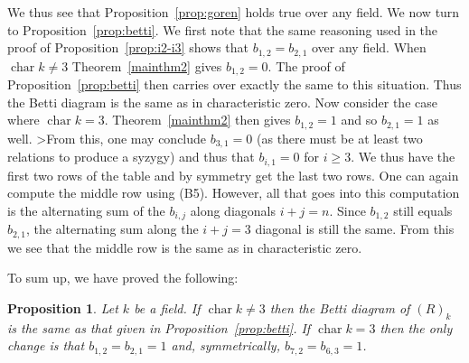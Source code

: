 \documentclass{amsart}
\newtheorem{proposition}[theorem]{Proposition}
\theoremstyle{definition}
\theoremstyle{remark}
\DeclareMathOperator{\chr}{char}
\begin{document}
We thus see that Proposition~\ref{prop:goren} holds true over any field.  We
now turn to Proposition~\ref{prop:betti}.  We first note that the same
reasoning used in the proof of Proposition~\ref{prop:i2-i3} shows that
$b_{1, 2}=b_{2, 1}$ over any field.  When $\chr{k} \ne 3$ Theorem~\ref{mainthm2}
gives $b_{1, 2}=0$.  The proof of Proposition~\ref{prop:betti} then carries
over exactly the same to this situation.  Thus the Betti diagram is the same
as in characteristic zero.  Now consider the case where $\chr{k}=3$.
Theorem~\ref{mainthm2} then gives $b_{1, 2}=1$ and so $b_{2, 1}=1$ as well.
>From this, one may conclude $b_{3, 1}=0$ (as there must be at least two relations
to produce a syzygy) and thus that $b_{i, 1}=0$ for $i \ge 3$.  We thus have the
first two rows of the table and by symmetry get the last two rows.  One can again
compute the middle row using (B5).  However, all that goes into this computation
is the alternating sum of the $b_{i, j}$ along diagonals $i+j=n$.  Since
$b_{1, 2}$ still equals $b_{2, 1}$, the alternating sum along the $i+j=3$ diagonal
is still the same.  From this we see that the middle row is the same as in
characteristic zero.

To sum up, we have proved the following:

\begin{proposition}
Let $k$ be a field.  If $\chr{k} \ne 3$ then the Betti diagram of $(R)_k$ is
the same as that given in Proposition~\ref{prop:betti}.  If $\chr{k}=3$ then
the only change is that $b_{1, 2}=b_{2, 1}=1$ and, symmetrically, $b_{7, 2}=
b_{6, 3}=1$.
\end{proposition}
\end{document}
